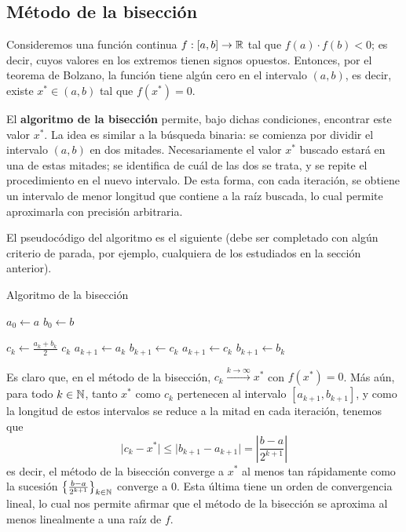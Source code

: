 \subsection{Método de la bisección}

Consideremos una función continua $f : [a,b] \to \mathbb{R}$ tal que $f(a) \cdot
f(b) < 0$; es decir, cuyos valores en los extremos tienen signos opuestos.
Entonces, por el teorema de Bolzano, la función tiene algún cero en el
intervalo $(a,b)$, es decir, existe $x^\ast \in (a,b)$ tal que $f(x^\ast) = 0$.

El \textbf{algoritmo de la bisección} permite, bajo dichas condiciones,
encontrar este valor $x^\ast$. La idea es similar a la búsqueda binaria: se
comienza por dividir el intervalo $(a,b)$ en dos mitades. Necesariamente
el valor $x^\ast$ buscado estará en una de estas mitades; se identifica de cuál
de las dos se trata, y se repite el procedimiento en el nuevo intervalo.
De esta forma, con cada iteración, se obtiene un intervalo de menor longitud
que contiene a la raíz buscada, lo cual permite aproximarla con precisión
arbitraria.

El pseudocódigo del algoritmo es el siguiente (debe ser completado con algún
criterio de parada, por ejemplo, cualquiera de los estudiados en la sección
anterior).

\begin{algorithm}[H]
\caption{Algoritmo de la bisección}
\label{algo:biseccion}


$a_0 \gets a$ \;
$b_0 \gets b$ \;

 {
    $c_k \gets \frac{a_k + b_k}{2}$ \;
     {
        \Return $c_k$ \;
    }
     {
        $a_{k+1} \gets a_k$ \;
        $b_{k+1} \gets c_k$ \;
    }
    {
        $a_{k+1} \gets c_k$ \;
        $b_{k+1} \gets b_k$ \;
    }
}

\end{algorithm}

Es claro que, en el método de la bisección, $c_k \xrightarrow{k \to \infty}
x^\ast$ con $f(x^\ast) = 0$. Más aún, para todo $k \in \mathbb{N}$, tanto $x^\ast$
como $c_k$ pertenecen al intervalo $[a_{k+1}, b_{k+1}]$, y como la longitud de
estos intervalos se reduce a la mitad en cada iteración, tenemos que
\[ \lvert c_k - x^\ast \rvert \leq \lvert b_{k+1} - a_{k+1} \rvert =
    \left\lvert \frac{b - a}{2^{k+1}} \right\rvert \]
es decir, el método de la bisección converge a $x^\ast$ al menos tan
rápidamente como la sucesión $\left\lbrace \frac{b - a}{2^{k+1}}
\right\rbrace_{k \in \mathbb{N}}$ converge a $0$. Esta última tiene un
orden de convergencia lineal, lo cual nos permite afirmar que el método de la
bisección se aproxima al menos linealmente a una raíz de $f$.

